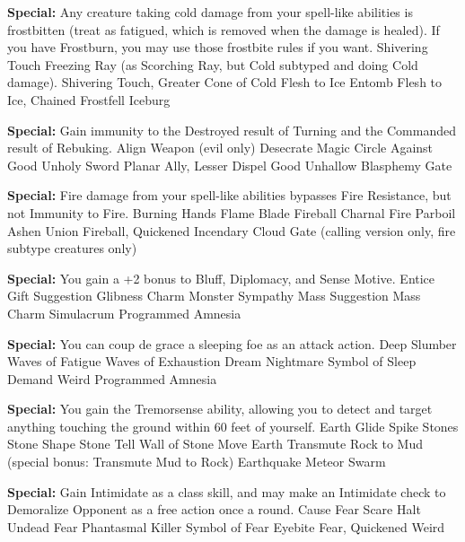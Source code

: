 \begin{multicols}{2}
\textbf{Special: }{Any creature taking cold damage from your spell-like abilities is frostbitten (treat as fatigued, which is removed when the damage is healed). If you have Frostburn, you may use those frostbite rules if you want.}
\sphere
{Shivering Touch}
{Freezing Ray (as Scorching Ray, but Cold subtyped and doing Cold damage).}
{Shivering Touch, Greater}
{Cone of Cold}
{Flesh to Ice}
{Entomb}
{Flesh to Ice, Chained}
{Frostfell}
{Iceburg}

\textbf{Special: }{Gain immunity to the Destroyed result of Turning and the Commanded result of Rebuking.}
\sphere
{Align Weapon (evil only)}
{Desecrate}
{Magic Circle Against Good}
{Unholy Sword}
{Planar Ally, Lesser}
{Dispel Good}
{Unhallow}
{Blasphemy}
{Gate}

\textbf{Special: }{Fire damage from your spell-like abilities bypasses Fire Resistance, but not Immunity to Fire.}
\sphere
{Burning Hands}
{Flame Blade}
{Fireball}
{Charnal Fire}
{Parboil}
{Ashen Union}
{Fireball, Quickened}
{Incendary Cloud}
{Gate (calling version only, fire subtype creatures only)}

\textbf{Special: }{You gain a +2 bonus to Bluff, Diplomacy, and Sense Motive.}
\sphere
{Entice Gift}
{Suggestion}
{Glibness}
{Charm Monster}
{Sympathy}
{Mass Suggestion}
{Mass Charm}
{Simulacrum}
{Programmed Amnesia}

\textbf{Special: }{You can coup de grace a sleeping foe as an attack action.}
\sphere
{Deep Slumber}
{Waves of Fatigue}
{Waves of Exhaustion}
{Dream}
{Nightmare}
{Symbol of Sleep}
{Demand}
{Weird}
{Programmed Amnesia}

\textbf{Special: }{You gain the Tremorsense ability, allowing you to detect and target anything touching the ground within 60 feet of yourself.}
\sphere
{Earth Glide}
{Spike Stones}
{Stone Shape}
{Stone Tell}
{Wall of Stone}
{Move Earth}
{Transmute Rock to Mud (special bonus: Transmute Mud to Rock)}
{Earthquake}
{Meteor Swarm}

\textbf{Special: }{Gain Intimidate as a class skill, and may make an Intimidate check to Demoralize Opponent as a free action once a round.}
\sphere
{Cause Fear}
{Scare}
{Halt Undead}
{Fear}
{Phantasmal Killer}
{Symbol of Fear}
{Eyebite}
{Fear, Quickened}
{Weird}


\end{multicols}
